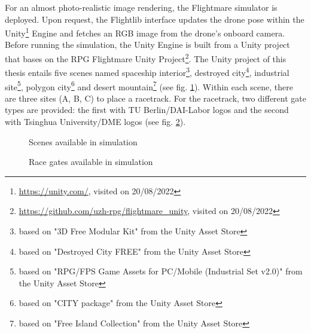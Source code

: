 For an almost photo-realistic image rendering,
the Flightmare \cite{Song2020} simulator 
is deployed.
Upon request, the Flightlib interface
updates the drone pose 
within the Unity\footnote{
    \url{https://unity.com/}, visited on 20/08/2022
} Engine
and fetches an RGB image from the drone's onboard camera.
Before running the simulation,
the Unity Engine is built from a Unity project
that bases on the RPG Flightmare Unity Project\footnote{
    \url{https://github.com/uzh-rpg/flightmare_unity}, visited on 20/08/2022
}.
The Unity project of this thesis
entails five scenes named
spaceship interior\footnote{
    based on "3D Free Modular Kit" from the Unity Asset Store
},
destroyed city\footnote{
    based on "Destroyed City FREE" from the Unity Asset Store
},
industrial site\footnote{
    based on "RPG/FPS Game Assets for PC/Mobile (Industrial Set v2.0)" from the Unity Asset Store
},
polygon city\footnote{
    based on "CITY package" from the Unity Asset Store
}
and desert mountain\footnote{
    based on "Free Island Collection" from the Unity Asset Store
}
(see fig. \ref{fig:unity_scenes}).
Within each scene, there are three sites (A, B, C) to place a racetrack.
For the racetrack, two different gate types are provided:
the first with TU Berlin/DAI-Labor logos and 
the second with Tsinghua University/DME logos
(see fig. \ref{fig:unity_gates}).
\begin{figure}
    \centering
    \par
    \caption[
        Scenes available in simulation
    ]{
        Scenes available in simulation
        \label{fig:unity_scenes}
    }
\end{figure}
\begin{figure}[h]
    \centering
    \caption[
        Race gates available in simulation
    ]{
        Race gates available in simulation
        \label{fig:unity_gates}
    }
\end{figure}

